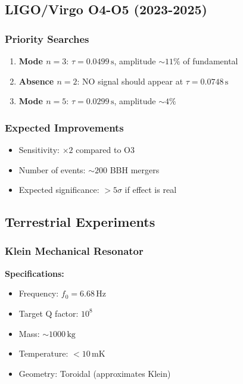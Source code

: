 \documentclass[12pt,a4paper]{article}
\begin{document}
\subsection{LIGO/Virgo O4-O5 (2023-2025)}

\subsubsection{Priority Searches}

\begin{enumerate}
    \item \textbf{Mode $n=3$}: $\tau = 0.0499\,\mathrm{s}$, amplitude $\sim 11\%$ of fundamental
    \item \textbf{Absence $n=2$}: NO signal should appear at $\tau = 0.0748\,\mathrm{s}$
    \item \textbf{Mode $n=5$}: $\tau = 0.0299\,\mathrm{s}$, amplitude $\sim 4\%$
\end{enumerate}

\subsubsection{Expected Improvements}

\begin{itemize}
    \item Sensitivity: $\times 2$ compared to O3
    \item Number of events: $\sim 200$ BBH mergers
    \item Expected significance: $>5\sigma$ if effect is real
\end{itemize}

\subsection{Terrestrial Experiments}

\subsubsection{Klein Mechanical Resonator}

\textbf{Specifications:}
\begin{itemize}
    \item Frequency: $f_0 = 6.68\,\mathrm{Hz}$
    \item Target Q factor: $10^8$
    \item Mass: $\sim 1000\,\mathrm{kg}$
    \item Temperature: $< 10\,\mathrm{mK}$
    \item Geometry: Toroidal (approximates Klein)
\end{itemize}
\end{document}
